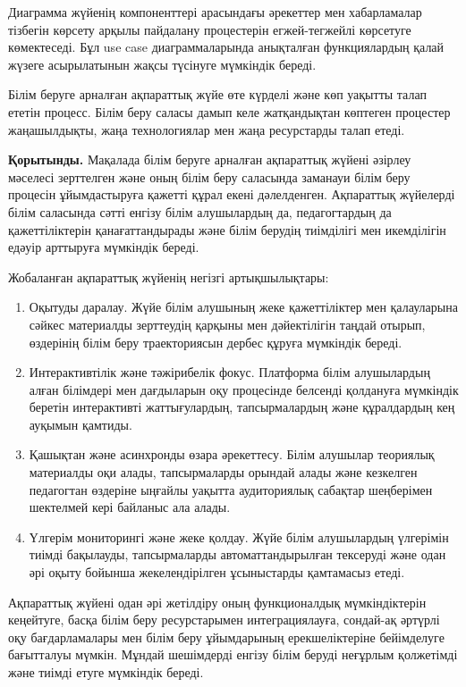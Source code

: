\begin{multicols}{2}
Диаграмма жүйенің компоненттері арасындағы әрекеттер мен хабарламалар
тізбегін көрсету арқылы пайдалану процестерін егжей-тегжейлі көрсетуге
көмектеседі. Бұл use case диаграммаларында анықталған функциялардың
қалай жүзеге асырылатынын жақсы түсінуге мүмкіндік береді.

Білім беруге арналған ақпараттық жүйе өте күрделі және көп уақытты талап
ететін процесс. Білім беру саласы дамып келе жатқандықтан көптеген
процестер жаңашылдықты, жаңа технологиялар мен жаңа ресурстарды талап
етеді.

{\bfseries Қорытынды.} Мақалада білім беруге арналған ақпараттық жүйені
әзірлеу мәселесі зерттелген және оның білім беру саласында заманауи
білім беру процесін ұйымдастыруға қажетті құрал екені дәлелденген.
Ақпараттық жүйелерді білім саласында сәтті енгізу білім алушылардың да,
педагогтардың да қажеттіліктерін қанағаттандырады және білім берудің
тиімділігі мен икемділігін едәуір арттыруға мүмкіндік береді.

Жобаланған ақпараттық жүйенің негізгі артықшылықтары:

\begin{enumerate}[leftmargin=*]
\def\labelenumi{\arabic{enumi}.}
\item
  Оқытуды даралау. Жүйе білім алушының жеке қажеттіліктер мен
  қалауларына сәйкес материалды зерттеудің қарқыны мен дәйектілігін
  таңдай отырып, өздерінің білім беру траекториясын дербес құруға
  мүмкіндік береді.
\item
  Интерактивтілік және тәжірибелік фокус. Платформа білім алушылардың
  алған білімдері мен дағдыларын оқу процесінде белсенді қолдануға
  мүмкіндік беретін интерактивті жаттығулардың, тапсырмалардың және
  құралдардың кең ауқымын қамтиды.
\item
  Қашықтан және асинхронды өзара әрекеттесу. Білім алушылар теориялық
  материалды оқи алады, тапсырмаларды орындай алады және кезкелген
  педагогтан өздеріне ыңғайлы уақытта аудиториялық сабақтар шеңберімен
  шектелмей кері байланыс ала алады.
\item
  Үлгерім мониторингі және жеке қолдау. Жүйе білім алушылардың үлгерімін
  тиімді бақылауды, тапсырмаларды автоматтандырылған тексеруді және одан
  әрі оқыту бойынша жекелендірілген ұсыныстарды қамтамасыз етеді.
\end{enumerate}

Ақпараттық жүйені одан әрі жетілдіру оның функционалдық мүмкіндіктерін
кеңейтуге, басқа білім беру ресурстарымен интеграциялауға, сондай-ақ
әртүрлі оқу бағдарламалары мен білім беру ұйымдарының ерекшеліктеріне
бейімделуге бағытталуы мүмкін. Мұндай шешімдерді енгізу білім беруді
неғұрлым қолжетімді және тиімді етуге мүмкіндік береді.
\end{multicols}

